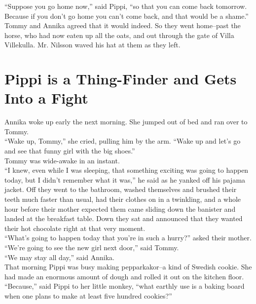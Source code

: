 \documentclass{standard}
\begin{document}
``Suppose you go home now,” said Pippi, ``so that you can come back tomorrow. Because if you don’t go home you can’t come back, and that would be a shame.”\\

Tommy and Annika agreed that it would indeed. So they went home--past the horse, who had now eaten up all the oats, and out through the gate of Villa Villekulla. Mr. Nilsson waved his hat at them as they left.
\newpage


\section{Pippi is a Thing-Finder and Gets Into a Fight}

Annika woke up early the next morning. She jumped out of bed and ran over to Tommy.\\

``Wake up, Tommy,” she cried, pulling him by the arm. ``Wake up and let’s go and see that funny girl with the big shoes.”\\

Tommy was wide-awake in an instant.\\

``I knew, even while I was sleeping, that something exciting was going to happen today, but I didn’t remember what it was,” he said as he yanked off his pajama jacket. Off they went to the bathroom, washed themselves and brushed their teeth much faster than usual, had their clothes on in a twinkling, and a whole hour before their mother expected them came sliding down the banister and landed at the breakfast table. Down they sat and announced that they wanted their hot chocolate right at that very moment.\\

``What’s going to happen today that you’re in such a hurry?” asked their mother. ``We’re going to see the new girl next door,” said Tommy.\\

``We may stay all day,” said Annika.\\

That morning Pippi was busy making pepparkakor--a kind of Swedish cookie. She had made an enormous amount of dough and rolled it out on the kitchen floor.\\

``Because,” said Pippi to her little monkey, ``what earthly use is a baking board when one plans to make at least five hundred cookies?”\\
\end{document}
